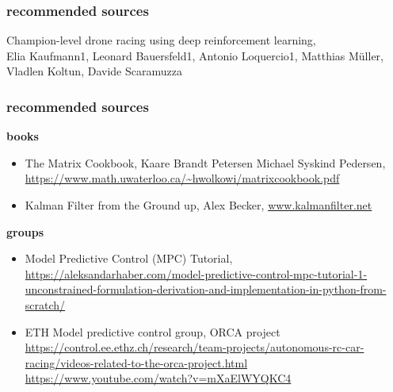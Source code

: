 \documentclass{beamer}
\begin{document}
\begin{frame}

  \frametitle{\bf recommended sources}
  Champion-level drone racing using deep reinforcement learning, \\
  Elia Kaufmann1, Leonard Bauersfeld1, Antonio Loquercio1, Matthias Müller, Vladlen Koltun, Davide Scaramuzza \\
  

\end{frame}




\begin{frame}
  \frametitle{\bf recommended sources}
  {\bf books}
  \begin{itemize}
    \item The Matrix Cookbook, Kaare Brandt Petersen Michael Syskind Pedersen, \url{https://www.math.uwaterloo.ca/~hwolkowi/matrixcookbook.pdf}
    \item Kalman Filter from the Ground up, Alex Becker, \url{www.kalmanfilter.net}
  \end{itemize}
  
  {\bf groups}
  \begin{itemize}
    \item Model Predictive Control (MPC) Tutorial, \url{https://aleksandarhaber.com/model-predictive-control-mpc-tutorial-1-unconstrained-formulation-derivation-and-implementation-in-python-from-scratch/}
    \item ETH Model predictive control group, ORCA project \\
      \url {https://control.ee.ethz.ch/research/team-projects/autonomous-rc-car-racing/videos-related-to-the-orca-project.html} \\
      \url{https://www.youtube.com/watch?v=mXaElWYQKC4}
  \end{itemize}

\end{frame}
\end{document}

